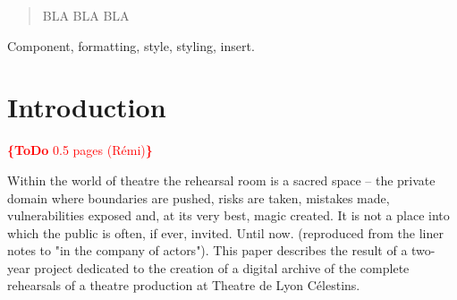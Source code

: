 \documentclass[conference]{IEEEtran}
\newcommand{\todo}[1]{\noindent\textcolor{red}{{\bf \{ToDo} #1{\bf \}}}}
\begin{document}




\maketitle


\begin{abstract}
BLA BLA BLA
\end{abstract}


\begin{keywords}
Component, formatting, style, styling, insert.
\end{keywords}

%
\IEEEpeerreviewmaketitle



\section{Introduction}

\todo{0.5 pages (Rémi)}

Within the world of theatre the rehearsal room is a sacred space -- the private domain where boundaries are pushed, risks are taken, mistakes made, vulnerabilities exposed and, at its very best, magic created. It is not a place into which the public is often, if ever, invited. Until now. (reproduced from the liner notes to "in the company of actors"). This paper describes the result of a two-year project dedicated to the creation of a digital archive  of  the complete  rehearsals of a theatre production at Theatre de Lyon Célestins.
\end{document}
